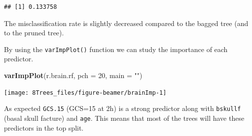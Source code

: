 \documentclass[10pt,ignorenonframetext,]{beamer}
\newenvironment{Shaded}{\begin{snugshade}}{\end{snugshade}}
\newcommand{\KeywordTok}[1]{\textcolor[rgb]{0.13,0.29,0.53}{\textbf{#1}}}
\newcommand{\DataTypeTok}[1]{\textcolor[rgb]{0.13,0.29,0.53}{#1}}
\newcommand{\DecValTok}[1]{\textcolor[rgb]{0.00,0.00,0.81}{#1}}
\newcommand{\StringTok}[1]{\textcolor[rgb]{0.31,0.60,0.02}{#1}}
\newcommand{\NormalTok}[1]{#1}
\begin{document}
\begin{frame}[fragile]
\begin{verbatim}
## [1] 0.133758
\end{verbatim}

\normalsize

The misclassification rate is slightly decreased compared to the bagged
tree (and to the pruned tree).

\end{frame}

\begin{frame}[fragile]

By using the \texttt{varImpPlot()} function we can study the importance
of each predictor.

\scriptsize

\begin{Shaded}
\begin{Highlighting}[]
\KeywordTok{varImpPlot}\NormalTok{(r.brain.rf, }\DataTypeTok{pch =} \DecValTok{20}\NormalTok{, }\DataTypeTok{main =} \StringTok{""}\NormalTok{)}
\end{Highlighting}
\end{Shaded}

\begin{center}\texttt{[image: 8Trees\_files/figure-beamer/brainImp-1]} \end{center}

\normalsize

As expected \texttt{GCS.15} (GCS=15 at 2h) is a strong predictor along
with \texttt{bskullf} (basal skull facture) and \texttt{age}. This means
that most of the trees will have these predictors in the top split.

\end{frame}
\end{document}
